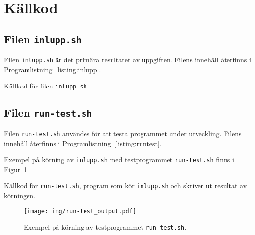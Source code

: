 %
%
%


\section{Källkod}

\subsection{Filen \texttt{inlupp.sh}}
Filen \texttt{inlupp.sh} är det primära resultatet av uppgiften.  
Filens innehåll återfinns i Programlistning~\ref{listing:inlupp}.

  \caption{Källkod för filen \texttt{inlupp.sh}}
  \label{listing:inlupp}


\subsection{Filen \texttt{run-test.sh}}
Filen \texttt{run-test.sh} användes för att testa programmet under utveckling.
Filens innehåll återfinns i Programlistning~\ref{listing:runtest}.

Exempel på körning av \texttt{inlupp.sh} med testprogrammet \texttt{run-test.sh}
finns i Figur~\ref{fig:runtest}

  \caption{Källkod för \texttt{run-test.sh}, program som kör \texttt{inlupp.sh}
           och skriver ut resultat av körningen.}
  \label{listing:runtest}

\begin{figure}%
  \centering 
  \texttt{[image: img/run-test\_output.pdf]}
  \caption{Exempel på körning av testprogrammet \texttt{run-test.sh}.}
  \label{fig:runtest}
\end{figure}
